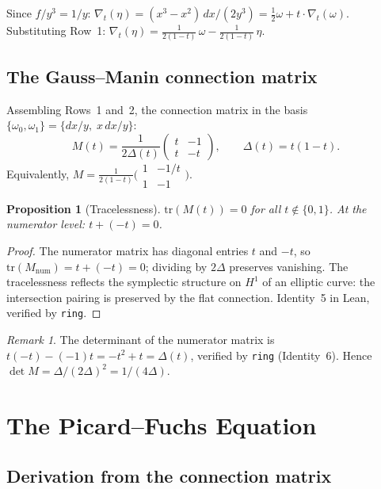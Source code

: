 \documentclass[11pt]{article}
\theoremstyle{plain}
\newtheorem{proposition}[theorem]{Proposition}
\theoremstyle{definition}
\theoremstyle{remark}
\newtheorem{remark}[theorem]{Remark}
\newcommand{\tr}{\mathrm{tr}}
\begin{document}
\noindent
Since $f/y^3 = 1/y$: $\nabla_t(\eta) = (x^3-x^2)\,dx/(2y^3) = \frac{1}{2}\omega + t\cdot\nabla_t(\omega)$.
Substituting Row~1: $\nabla_t(\eta) = \frac{1}{2(1-t)}\,\omega - \frac{1}{2(1-t)}\,\eta$.

\subsection{The Gauss--Manin connection matrix}

Assembling Rows~1 and~2, the connection matrix in the basis
$\{\omega_0, \omega_1\} = \{dx/y,\; x\,dx/y\}$:
\[
  M(t) = \frac{1}{2\Delta(t)}
  \begin{pmatrix}
    t & -1 \\
    t & -t
  \end{pmatrix},
  \qquad \Delta(t) = t(1-t).
\]
Equivalently, $M = \frac{1}{2(1-t)}\bigl(\begin{smallmatrix} 1 & -1/t \\ 1 & -1 \end{smallmatrix}\bigr)$.

\begin{proposition}[Tracelessness]\label{prop:trace}
$\tr(M(t)) = 0$ for all $t \notin \{0, 1\}$.
At the numerator level: $t + (-t) = 0$.
\end{proposition}
\begin{proof}
The numerator matrix has diagonal entries $t$ and $-t$, so
$\tr(M_{\mathrm{num}}) = t + (-t) = 0$; dividing by $2\Delta$ preserves vanishing.
The tracelessness reflects the symplectic structure on $H^1$ of
an elliptic curve: the intersection pairing is preserved by the
flat connection.  Identity~5 in Lean, verified by \texttt{ring}.
\end{proof}

\begin{remark}\label{rem:determinant}
The determinant of the numerator matrix is $t(-t) - (-1)t = -t^2 + t = \Delta(t)$,
verified by \texttt{ring} (Identity~6).  Hence $\det M = \Delta/(2\Delta)^2 = 1/(4\Delta)$.
\end{remark}

\section{The Picard--Fuchs Equation}\label{sec:pf}

\subsection{Derivation from the connection matrix}
\end{document}
